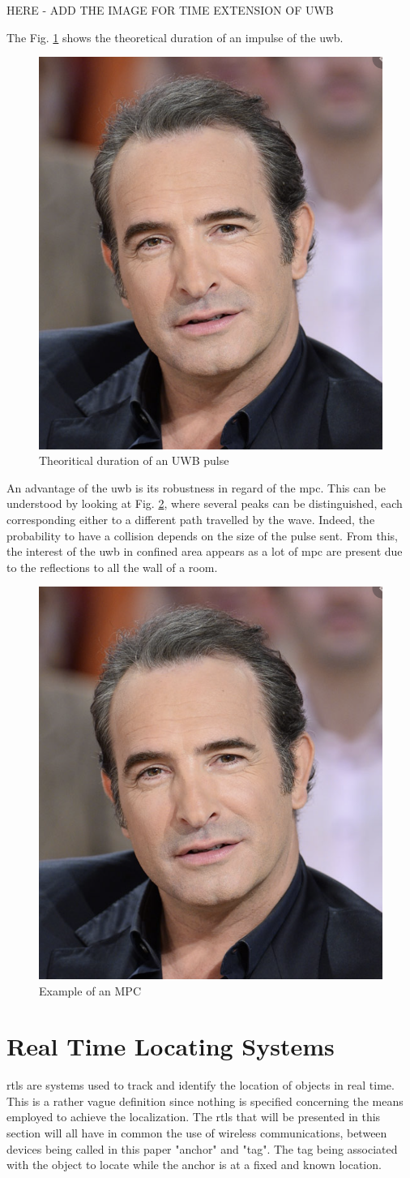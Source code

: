 HERE - ADD THE IMAGE FOR TIME EXTENSION OF UWB

The Fig. \ref{fig:UWB_time} shows the theoretical duration of an impulse of the \gls{uwb}.

\begin{figure}[H]
\centering
\includegraphics[width=.2\linewidth]{Images/Temporary_pic.png}
\caption{Theoritical duration of an UWB pulse}
\label{fig:UWB_time}
\end{figure}

An advantage of the \gls{uwb} is its robustness in regard of the \gls{mpc}. This can be understood by looking at Fig. \ref{fig:UWB_MPC_Theo}, where several peaks can be distinguished, each corresponding either to a different path travelled by the wave. Indeed, the probability to have a collision depends on the size of the pulse sent. From this, the interest of the \gls{uwb} in confined area appears as a lot of \gls{mpc} are present due to the reflections to all the wall of a room.

\begin{figure}[H]
\centering
\includegraphics[width=.2\linewidth]{Images/Temporary_pic.png}
\caption{Example of an MPC}
\label{fig:UWB_MPC_Theo}
\end{figure}

\section{Real Time Locating Systems}
\label{rtls}
\gls{rtls} are systems used to track and identify the location of objects in real time. This is a rather vague definition since nothing is specified concerning the means employed to achieve the localization. The \gls{rtls} that will be presented in this section will all have in common the use of wireless communications, between devices being called in this paper "anchor" and "tag". The tag being associated with the object to locate while the anchor is at a fixed and known location.
\vspace{2mm}

